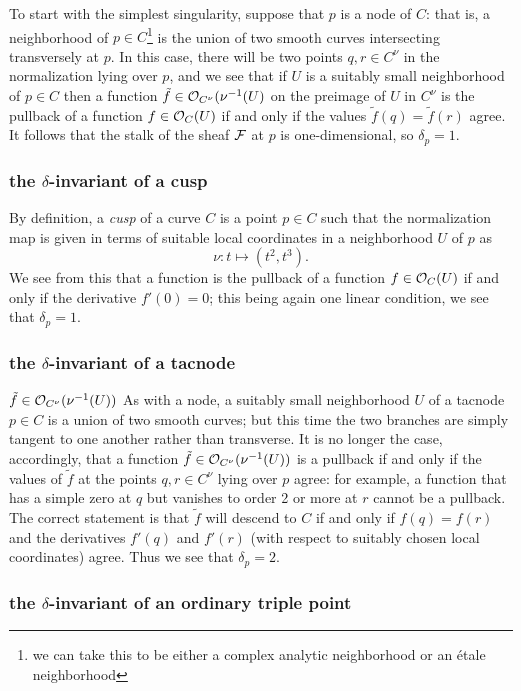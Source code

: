 To start with the simplest singularity, suppose that $p$ is a node of $C$: that is, a neighborhood of $p \in C$\footnote{we can take this to be either a complex analytic neighborhood or an \'etale neighborhood} is the union of two smooth curves intersecting transversely at $p$. In this case, there will be two points $q, r \in C^\nu$ in the normalization lying over $p$, and we see that if $U$ is a suitably small neighborhood of $p \in C$ then a function $\tilde f \in {\mathcal O}_{C^\nu}(\nu^{-1}(U)$ on the preimage of $U$ in $C^\nu$  is the pullback of a function $f \in {\mathcal O}_C(U)$ if and only if the values $\tilde f(q) = \tilde f(r)$ agree. It follows that the stalk of the sheaf ${\mathcal F}$ at $p$ is one-dimensional, so $\delta_p = 1$.

\subsubsection{the $\delta$-invariant of a cusp}

By definition, a \emph{cusp} of a curve $C$ is a point $p \in C$ such that the normalization map is given in terms of suitable local coordinates in a neighborhood $U$ of $p$ as
$$
\nu : t \mapsto (t^2, t^3).
$$
We see from this that a function  is the pullback of a function $f \in {\mathcal O}_C(U)$ if and only if the derivative $f'(0) = 0$; this being again one linear condition, we see that $\delta_p = 1$.

\subsubsection{the $\delta$-invariant of a tacnode}
$\tilde f \in {\mathcal O}_{C^\nu}(\nu^{-1}(U))$
As with a node, a suitably small neighborhood $U$ of a tacnode $p \in C$ is a union of two smooth curves; but this time the two branches are simply tangent to one another rather than transverse. It is no longer the case, accordingly, that a function $\tilde f \in {\mathcal O}_{C^\nu}(\nu^{-1}(U))$ is a pullback if and only if the values of $\tilde f$ at the points  $q, r \in C^\nu$ lying over $p$ agree: for example, a function that has a simple zero at $q$ but vanishes to order 2 or more at $r$ cannot be a pullback. The correct statement is that $\tilde f$ will descend to $C$ if and only if $f(q) = f(r)$ and the derivatives $f'(q)$ and $f'(r)$ (with respect to suitably chosen local coordinates) agree. Thus we see that $\delta_p = 2$.

\subsubsection{the $\delta$-invariant of an ordinary triple point}


